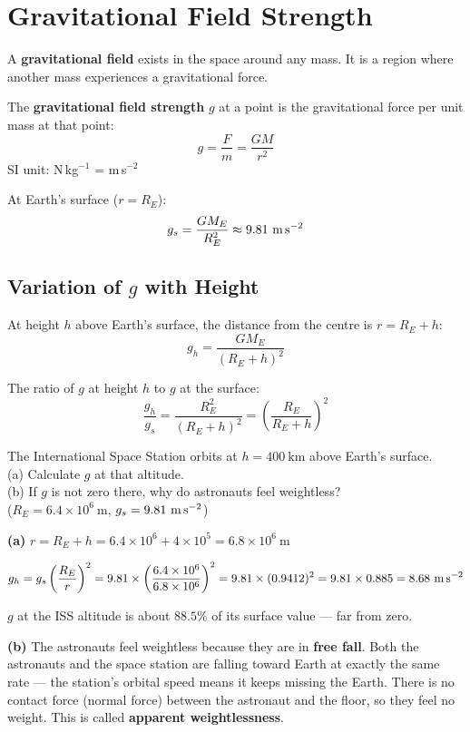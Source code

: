 \section{Gravitational Field Strength}

\begin{definitionbox}
A \textbf{gravitational field} exists in the space
around any mass. It is a region where another mass
experiences a gravitational force.

The \textbf{gravitational field strength} $g$ at a
point is the gravitational force per unit mass at
that point:
\[
  g = \frac{F}{m} = \frac{GM}{r^2}
\]
SI unit: N\,kg$^{-1}$ = m\,s$^{-2}$

At Earth's surface ($r = R_E$):
\[
  g_s = \frac{GM_E}{R_E^2}
  \approx 9.81\ \text{m\,s}^{-2}
\]
\end{definitionbox}

\subsection{Variation of \texorpdfstring{$g$}{g} with Height}

At height $h$ above Earth's surface, the distance
from the centre is $r = R_E + h$:
\[
  g_h = \frac{GM_E}{(R_E+h)^2}
\]

The ratio of $g$ at height $h$ to $g$ at the surface:
\[
  \frac{g_h}{g_s} = \frac{R_E^2}{(R_E+h)^2}
  = \left(\frac{R_E}{R_E+h}\right)^2
\]

\begin{examplebox}[8.2]
The International Space Station orbits at
$h = 400\ \text{km}$ above Earth's surface.\\
(a) Calculate $g$ at that altitude.\\
(b) If $g$ is not zero there, why do astronauts
feel weightless?\\
($R_E = 6.4\times10^6\ \text{m}$,
$g_s = 9.81\ \text{m\,s}^{-2}$)
\end{examplebox}

\begin{solutionbox}
\textbf{(a)} $r = R_E + h
= 6.4\times10^6 + 4\times10^5
= 6.8\times10^6\ \text{m}$

\[
  g_h = g_s\left(\frac{R_E}{r}\right)^2
  = 9.81 \times \left(\frac{6.4\times10^6}
  {6.8\times10^6}\right)^2
  = 9.81 \times (0.9412)^2
  = 9.81 \times 0.885
  = 8.68\ \text{m\,s}^{-2}
\]

$g$ at the ISS altitude is about $88.5\%$ of its
surface value --- far from zero.

\textbf{(b)} The astronauts feel weightless because
they are in \textbf{free fall}. Both the astronauts
and the space station are falling toward Earth at
exactly the same rate --- the station's orbital
speed means it keeps missing the Earth. There is no
contact force (normal force) between the astronaut
and the floor, so they feel no weight. This is
called \textbf{apparent weightlessness}.
\end{solutionbox}

